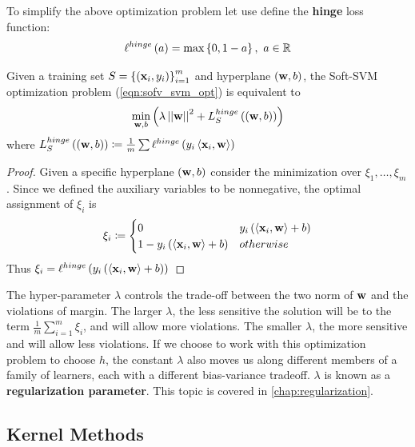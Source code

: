 To simplify the above optimization problem let use define the \textbf{hinge} loss function:
\begin{equation}
	\ell^{hinge}\left(a\right)=\max\left\{0,1-a\right\},\,\, a\in\mathbb{R}
\end{equation}

\begin{claim}
	Given a training set $S=\left\{\left(\mathbf{x}_i,y_i\right)\right\}^m_{i=1}$ and hyperplane $\left(\mathbf{w},b\right)$, the Soft-SVM optimization problem (\ref{eqn:sofv_svm_opt}) is equivalent to $$ \underset{\mathbf{w},b}{\min} \left(\lambda\left|\left| \mathbf{w}\right|\right|^2+L_S^{hinge}\left(\left(\mathbf{w},b\right)\right)\right) $$ where $L_S^{hinge}\left(\left(\mathbf{w},b\right)\right)\coloneqq \frac{1}{m}\sum \ell^{hinge}\left(y_i\left\langle \mathbf{x}_i,\mathbf{w}\right\rangle\right)$
\end{claim}

\begin{proof}
	Given a specific hyperplane $\left(\mathbf{w},b\right)$ consider the minimization over $\xi_1,\ldots,\xi_m$. Since we defined the auxiliary variables to be nonnegative, the optimal assignment of $\xi_i$ is $$ \xi_i \coloneqq \begin{cases}
		0 & y_i\left(\left\langle \mathbf{x}_i,\mathbf{w}\right\rangle+b\right)\\
		1-y_i\left(\left\langle \mathbf{x}_i,\mathbf{w}\right\rangle+b\right) & otherwise\\
	\end{cases} $$
	Thus $\xi_i=\ell^{hinge}\left(y_i\left(\left\langle \mathbf{x}_i,\mathbf{w}\right\rangle+b\right)\right)$
\end{proof}

The hyper-parameter $\lambda$ controls the trade-off between the two norm of $\mathbf{w}$ and the violations of margin. The larger $\lambda$, the less sensitive the solution will be to the term $\frac{1}{m}\sum_{i=1}^m \xi_i$, and will allow more violations. The smaller $\lambda$, the more sensitive and will allow less violations. If we choose to work with this optimization problem to choose $h$, the constant $\lambda$ also moves us along different members of a family of learners, each with a different bias-variance tradeoff. $\lambda$ is known as a \textbf{regularization parameter}. This topic is covered in \autoref{chap:regularization}.



\subsection{Kernel Methods}\label{kernel_method}

